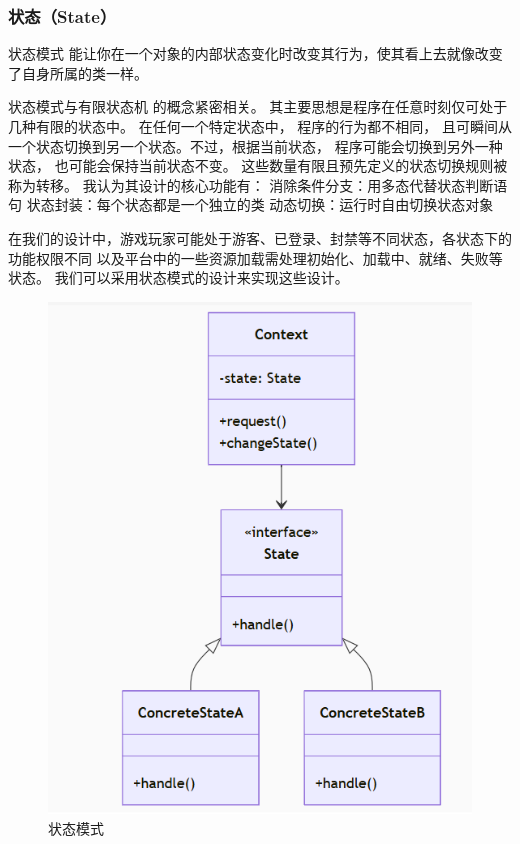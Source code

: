 \documentclass[12pt]{ctexart} %
\begin{document}
\subsubsection{状态（State）} 
状态模式 能让你在一个对象的内部状态变化时改变其行为，使其看上去就像改变了自身所属的类一样。

状态模式与有限状态机 的概念紧密相关。
其主要思想是程序在任意时刻仅可处于几种有限的状态中。 在任何一个特定状态中， 程序的行为都不相同， 
且可瞬间从一个状态切换到另一个状态。不过，根据当前状态，
程序可能会切换到另外一种状态， 也可能会保持当前状态不变。 
这些数量有限且预先定义的状态切换规则被称为转移。
我认为其设计的核心功能有：
消除条件分支：用多态代替状态判断语句
状态封装：每个状态都是一个独立的类
动态切换：运行时自由切换状态对象

在我们的设计中，游戏玩家可能处于游客、已登录、封禁等不同状态，各状态下的功能权限不同
以及平台中的一些资源加载需处理初始化、加载中、就绪、失败等状态。
我们可以采用状态模式的设计来实现这些设计。

\begin{figure}[H]
  \centering
  \includegraphics[width=1\textwidth]{zhuangtai.png}
  \caption{状态模式}
\end{figure}
\end{document}
